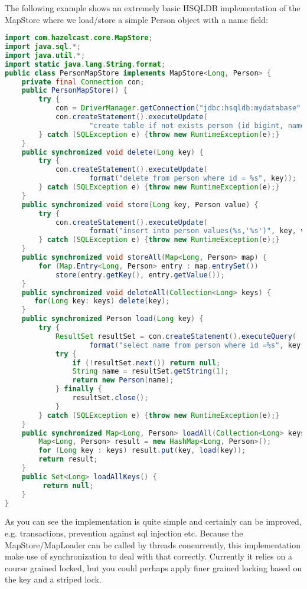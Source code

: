 The following example shows an extremely basic HSQLDB implementation of the MapStore where we load/store a simple Person object with a name field:
\begin{lstlisting}[language=java]
import com.hazelcast.core.MapStore;
import java.sql.*;
import java.util.*;
import static java.lang.String.format;
public class PersonMapStore implements MapStore<Long, Person> {
    private final Connection con;
    public PersonMapStore() {
        try {
            con = DriverManager.getConnection("jdbc:hsqldb:mydatabase", "SA", "");
            con.createStatement().executeUpdate(
                    "create table if not exists person (id bigint, name varchar(45))");
        } catch (SQLException e) {throw new RuntimeException(e);}
    }
    public synchronized void delete(Long key) {
        try {
            con.createStatement().executeUpdate(
                    format("delete from person where id = %s", key));
        } catch (SQLException e) {throw new RuntimeException(e);}
    }
    public synchronized void store(Long key, Person value) {
        try {
            con.createStatement().executeUpdate(
                    format("insert into person values(%s,'%s')", key, value.name));
        } catch (SQLException e) {throw new RuntimeException(e);}
    }
    public synchronized void storeAll(Map<Long, Person> map) {
        for (Map.Entry<Long, Person> entry : map.entrySet())
            store(entry.getKey(), entry.getValue());
    }
    public synchronized void deleteAll(Collection<Long> keys) {
       for(Long key: keys) delete(key);
    }
    public synchronized Person load(Long key) {
        try {
            ResultSet resultSet = con.createStatement().executeQuery(
                    format("select name from person where id =%s", key));
            try {
                if (!resultSet.next()) return null;
                String name = resultSet.getString(1);
                return new Person(name);
            } finally {
                resultSet.close();
            }
        } catch (SQLException e) {throw new RuntimeException(e);}
    }
    public synchronized Map<Long, Person> loadAll(Collection<Long> keys) {
        Map<Long, Person> result = new HashMap<Long, Person>();
        for (Long key : keys) result.put(key, load(key));
        return result;
    }
    public Set<Long> loadAllKeys() {
         return null;
    }
}
\end{lstlisting}
As you can see the implementation is quite simple and certainly can be improved, e.g. transactions, prevention against sql injection etc. Because the MapStore/MapLoader can be called by threads concurrently, this implementation make use of synchronization to deal with that correctly. Currently it relies on a course grained locked, but you could perhaps apply finer grained locking based on the key and a striped lock.

